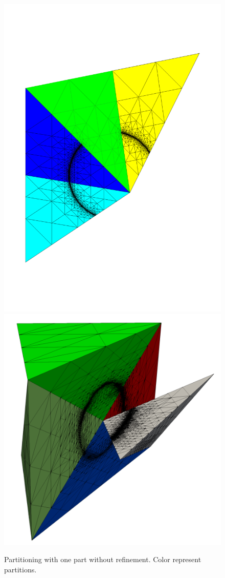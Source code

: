 \documentclass{article}
\begin{document}
\begin{figure}[htbp]
	\centering
	\includegraphics[width=0.48\linewidth]{figures/partitioning_with_one_part_without_refinement} \hfill
	\includegraphics[width=0.48\linewidth]{figures/newest_vertex_bisection}
	\caption{Partitioning with one part without refinement. Color represent partitions.}
	\label{fig:par_refinement}
\end{figure}
\end{document}
